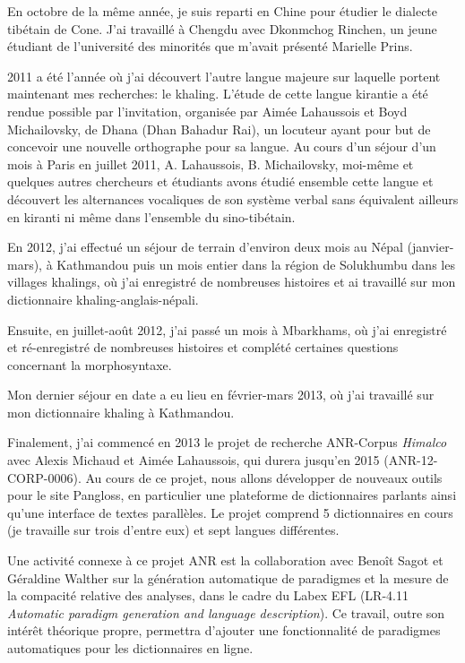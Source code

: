 \documentclass[oldfontcommands,oneside,a4paper,11pt]{memoir}
\begin{document}
En octobre de la même année, je suis reparti en Chine pour étudier le dialecte tibétain de Cone. J'ai travaillé à Chengdu avec Dkonmchog Rinchen, un jeune étudiant de l'université des minorités que m'avait présenté Marielle Prins.

2011 a   été l'année où j'ai découvert l'autre langue majeure sur laquelle portent maintenant mes recherches: le khaling. L'étude de cette langue kirantie a été rendue possible par l'invitation, organisée par Aimée Lahaussois et Boyd Michailovsky, de Dhana (Dhan Bahadur Rai), un locuteur ayant pour but de concevoir une nouvelle orthographe pour sa langue. Au cours d'un séjour d'un mois à Paris en juillet 2011, A. Lahaussois, B. Michailovsky, moi-même et quelques autres chercheurs et étudiants avons étudié ensemble cette langue et découvert les alternances vocaliques de son système verbal sans équivalent ailleurs en kiranti ni même dans l'ensemble du sino-tibétain.


En 2012, j'ai effectué un séjour de terrain d'environ deux mois au Népal (janvier-mars), à Kathmandou puis un mois entier dans la région de Solukhumbu dans les villages khalings, où j'ai enregistré de nombreuses histoires et ai travaillé sur mon dictionnaire khaling-anglais-népali.  

Ensuite, en juillet-août 2012, j'ai passé un mois à Mbarkhams, où j'ai enregistré et ré-enregistré de nombreuses histoires et complété certaines questions concernant la morphosyntaxe.

Mon dernier séjour en date a eu lieu en février-mars 2013, où j'ai travaillé sur mon dictionnaire khaling à Kathmandou. 

Finalement, j'ai commencé en 2013 le projet de recherche ANR-Corpus \textit{Himalco} avec Alexis Michaud et Aimée Lahaussois, qui durera jusqu'en 2015 (ANR-12-CORP-0006). Au cours de ce projet, nous allons développer de nouveaux outils pour le site Pangloss, en particulier une plateforme de dictionnaires parlants ainsi qu'une interface de textes parallèles. Le projet comprend 5 dictionnaires en cours (je travaille sur trois d'entre eux) et sept langues différentes.

Une activité connexe à ce projet ANR est la collaboration avec Benoît Sagot et Géraldine Walther sur la génération automatique de paradigmes et la mesure de la compacité relative des analyses, dans le cadre du Labex EFL (LR-4.11 \textit{Automatic paradigm generation and language description}). Ce travail, outre son intérêt théorique propre, permettra d'ajouter une fonctionnalité de paradigmes automatiques pour les dictionnaires en ligne.
 
\end{document}
